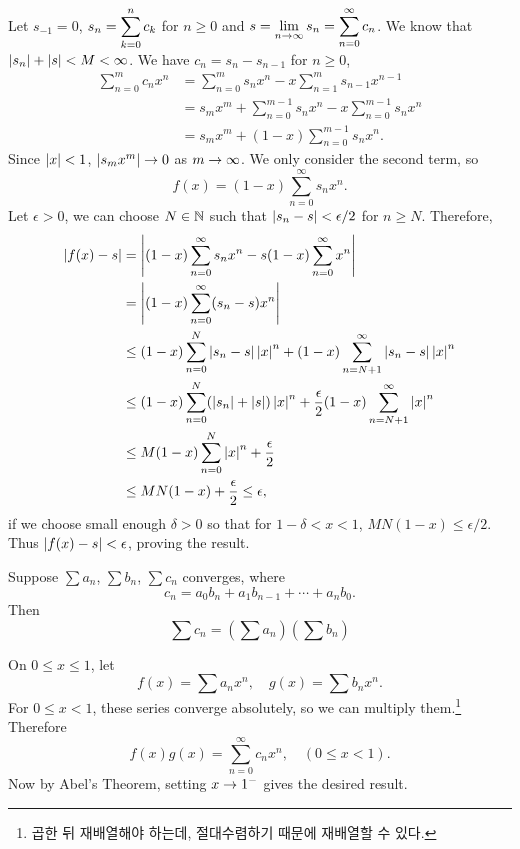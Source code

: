 \pf Let \(s_{-1} = 0\), \(\displaystyle s_n = \sum_{k=0}^n c_k\) for \(n \geq 0\) and \(\displaystyle s = \lim_{n\rightarrow\infty} s_n = \sum_{n=0}^\infty c_n\). We know that \(\left| s_n \right| + \left| s \right| < M <\infty\). We have \(c_n = s_n - s_{n-1}\) for \(n \geq 0\),
\[
    \begin{aligned}
        \sum_{n=0}^m c_nx^n & = \sum_{n=0}^m s_n x^n - x \sum_{n=1}^m s_{n-1}x^{n-1}            \\
                            & = s_m x^m + \sum_{n=0}^{m-1} s_n x^n - x \sum_{n=0}^{m-1} s_n x^n \\
                            & = s_m x^m + (1-x) \sum_{n=0}^{m-1}s_n x^n.
    \end{aligned}
\]
Since \(\left| x \right| < 1\), \(\left| s_m x^m \right| \rightarrow 0\) as \(m \rightarrow \infty\). We only consider the second term, so
\[
    f(x) = (1-x) \sum_{n=0}^\infty s_n x^n.
\]
Let \(\epsilon > 0\), we can choose \(N\in \mathbb{N}\) such that \(\left| s_n - s \right| < \epsilon / 2\) for \(n \geq N\).
Therefore,
\[
    \begin{aligned}
        \left| f(x) - s \right| & = \left| (1-x) \sum_{n=0}^\infty s_n x^n - s(1-x) \sum_{n=0}^\infty x^n \right|                                        \\
                       & = \left| (1-x) \sum_{n=0}^\infty (s_n - s) x^n \right|                                                                 \\
                       & \leq (1-x) \sum_{n=0}^N \left| s_n - s \right| \left| x \right|^n + (1-x) \sum_{n=N+1}^\infty \left| s_n-s \right| \left| x \right|^n             \\
                       & \leq (1-x) \sum_{n=0}^N (\left| s_n \right| +\left| s \right|) \left| x \right|^n + \frac{\epsilon}{2}(1-x)\sum_{n=N+1}^\infty \left| x \right|^n \\
                       & \leq M(1-x) \sum_{n=0}^N  \left| x \right|^n + \frac{\epsilon}{2}                                                      \\
                       & \leq MN(1-x) + \frac{\epsilon}{2} \leq \epsilon,
    \end{aligned}
\]
if we choose small enough \(\delta > 0\) so that for \(1 - \delta < x < 1\), \(MN(1-x) \leq \epsilon / 2\). Thus \(\left| f(x) - s \right| < \epsilon\), proving the result.

  Suppose \(\sum a_n\), \(\sum b_n\), \(\sum c_n\) converges, where
\[
    c_n = a_0 b_n + a_1 b_{n-1} + \cdots + a_n b_0.
\]
Then
\[
    \sum c_n = \left(\sum a_n\right) \left(\sum b_n\right)
\]

\pf On \(0 \leq x \leq 1\), let
\[
    f(x) = \sum a_n x^n, \quad g(x) = \sum b_n x^n.
\]
For \(0 \leq x < 1\), these series converge absolutely, so we can multiply them.\footnote{곱한 뒤 재배열해야 하는데, 절대수렴하기 때문에 재배열할 수 있다.} Therefore
\[
    f(x)g(x) = \sum_{n=0}^\infty c_n x^n, \quad (0 \leq x < 1).
\]
Now by Abel's Theorem, setting \(x \rightarrow 1^-\) gives the desired result.

